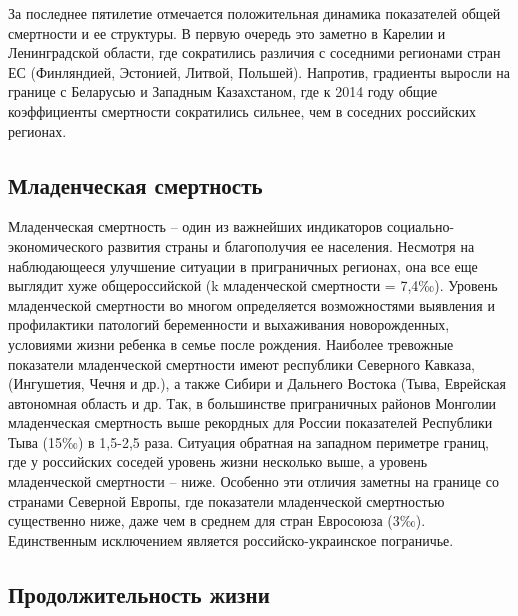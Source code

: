 \documentclass[]{book}
\begin{document}
За последнее пятилетие отмечается положительная динамика показателей
общей смертности и ее структуры. В первую очередь это заметно в Карелии
и Ленинградской области, где сократились различия с соседними регионами
стран ЕС (Финляндией, Эстонией, Литвой, Польшей). Напротив, градиенты
выросли на границе с Беларусью и Западным Казахстаном, где к 2014 году
общие коэффициенты смертности сократились сильнее, чем в соседних
российских регионах.

\hypertarget{demo-situ-bab}{%
\subsection{Младенческая смертность}\label{demo-situ-bab}}

Младенческая смертность -- один из важнейших индикаторов
социально-экономического развития страны и благополучия ее населения.
Несмотря на наблюдающееся улучшение ситуации в приграничных регионах,
она все еще выглядит хуже общероссийской (k младенческой смертности =
7,4‰). Уровень младенческой смертности во многом определяется
возможностями выявления и профилактики патологий беременности и
выхаживания новорожденных, условиями жизни ребенка в семье после
рождения. Наиболее тревожные показатели младенческой смертности имеют
республики Северного Кавказа, (Ингушетия, Чечня и др.), а также Сибири и
Дальнего Востока (Тыва, Еврейская автономная область и др. Так, в
большинстве приграничных районов Монголии младенческая смертность выше
рекордных для России показателей Республики Тыва (15‰) в 1,5-2,5 раза.
Ситуация обратная на западном периметре границ, где у российских соседей
уровень жизни несколько выше, а уровень младенческой смертности -- ниже.
Особенно эти отличия заметны на границе со странами Северной Европы, где
показатели младенческой смертностью существенно ниже, даже чем в среднем
для стран Евросоюза (3‰). Единственным исключением является
российско-украинское пограничье.

\hypertarget{demo-situ-long}{%
\subsection{Продолжительность жизни}\label{demo-situ-long}}
\end{document}
